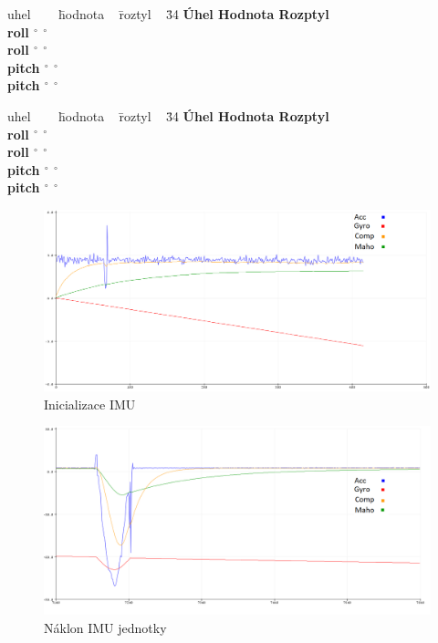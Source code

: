 \begin{tabbing}
	uhel ~~~ \= hodnota ~ \= roztyl ~
	\= 34 \kill
	\bfseries Úhel \>
	\bfseries Hodnota \>
	\bfseries Rozptyl \\
	roll $^\circ$ $^\circ$  \\
	roll $^\circ$ $^\circ$ \\
	pitch $^\circ$ $^\circ$  \\
	pitch $^\circ$ $^\circ$  \\
\end{tabbing}

\begin{tabbing}
	uhel ~~~ \= hodnota ~ \= roztyl ~
	\= 34 \kill
	\bfseries Úhel \>
	\bfseries Hodnota \>
	\bfseries Rozptyl \\
	roll $^\circ$ $^\circ$  \\
	roll  $^\circ$ $^\circ$ \\
	pitch  $^\circ$ $^\circ$  \\
	pitch  $^\circ$ $^\circ$  \\
\end{tabbing}

\begin{figure}[h]
	\centering
	\includegraphics[width=14cm]{pictures/testRoll}
	\caption{Inicializace IMU}
\end{figure}

\begin{figure}[h]
	\centering
	\includegraphics[width=14cm]{pictures/testRoll1}
	\caption{Náklon IMU jednotky}
\end{figure}

